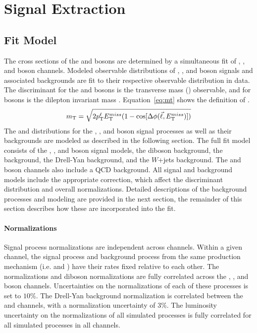\chapter{Signal Extraction}\label{ch:sig}
\section{Fit Model}\label{ch:sig:fit}
The cross sections of the \Wpm and \Z bosons are determined by a simultaneous fit of \Wp, \Wm, and \Z boson channels. Modeled observable distributions of \Wp, \Wm, and \Z boson signals and associated backgrounds are fit to their respective observable distribution in data. The discriminant for the \Wp and \Wm bosons is the transverse mass (\mt) observable, and for \Z bosons is the dilepton invariant mass \mll. Equation~\ref{eq:mt} shows the definition of \mt.
\begin{equation}
m_{\mathrm{T}} = \sqrt{ 2 p_{\mathrm{T}}^{\ell} E_{\mathrm{T}}^{miss} ( 1 - \cos[\Delta\phi( {\vec \ell},E_{\mathrm{T}}^{miss} ) ] ) }
\label{eq:mt}
\end{equation}
The \mll and \mt distributions for the \Wp, \Wm, and \Z boson signal processes as well as their backgrounds are modeled as described in the following section. 
The full fit model consists of the \Wp, \Wm, and \Z boson signal models, the diboson background, the \ttbar background, the Drell-Yan background, and the $W$+jets background. The \Wp and \Wm boson channels also include a QCD background. All signal and background models include the appropriate correction, which affect the discriminant distribution and overall normalizations. Detailed descriptions of the background processes and modeling are provided in the next section, the remainder of this section describes how these are incorporated into the  fit. 
\subsubsection{Normalizations}
Signal process normalizations are independent across channels. Within a given channel, the signal process and background process from the same production mechanism (i.e. \wmunu and \wtau) have their rates fixed relative to each other. The \ttbar normalizations and diboson normalizations are fully correlated across the \Wp, \Wm, and \Z boson channels. Uncertainties on the normalizations of each of these processes is set to $10\%$. The Drell-Yan background normalization is correlated between the \Wp and \Wm channels, with a normalization uncertainty of $3\%$. The luminosity uncertainty on the normalizations of all simulated processes is fully correlated for all simulated processes in all channels. 

